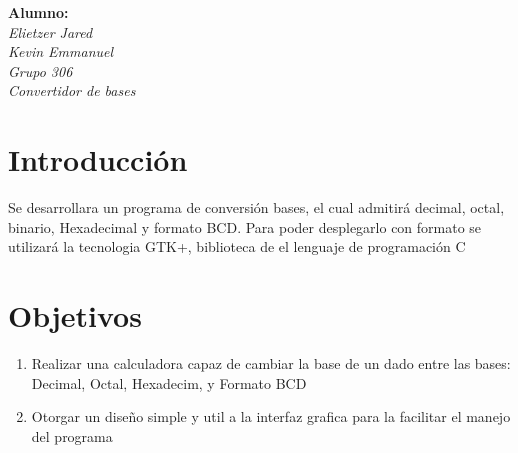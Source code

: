\documentclass[letterpaper,12pt]{extarticle}%
\begin{document}
    \newpage
    \tableofcontents
    \newpage
    
    \begin{center}
    \textbf{ Alumno:}\\[3mm]
    {\it Elietzer Jared}\\[3mm]
    {\it Kevin Emmanuel}\\[3mm]
    {\it Grupo 306}\\[3mm]
    {\it Convertidor de bases}\\[3mm]
    \end{center}
    


    \section{Introducción}
    
		Se desarrollara un programa de conversión 
		bases, el cual admitirá decimal, octal, binario, Hexadecimal
		y formato BCD. Para poder desplegarlo con formato
		se utilizará la tecnologia GTK+, biblioteca
		de el lenguaje de programación C 

        
    \section{Objetivos}
			
    \begin{enumerate}
		\item Realizar una calculadora capaz de cambiar la base de un
		dado entre las bases: Decimal, Octal, Hexadecim,
		y Formato BCD

		\item Otorgar un diseño simple y util a la interfaz grafica
		para la facilitar el manejo del programa 
	
	\end{enumerate} 
\end{document}
